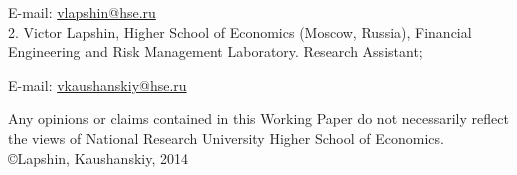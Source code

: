 \documentclass[10pt]{article}
\begin{document}
E-mail: \href{mailto:vlapshin@hse.ru}{vlapshin@hse.ru}\\
2. Victor Lapshin, Higher School of Economics (Moscow, Russia), Financial Engineering and Risk Management Laboratory. Research Assistant;

E-mail: \href{mailto:vkaushanskiy@hse.ru}{vkaushanskiy@hse.ru}

Any opinions or claims contained in this Working Paper do not necessarily reflect the views of National Research University Higher School of Economics.\\
©Lapshin, Kaushanskiy, 2014
\end{document}
